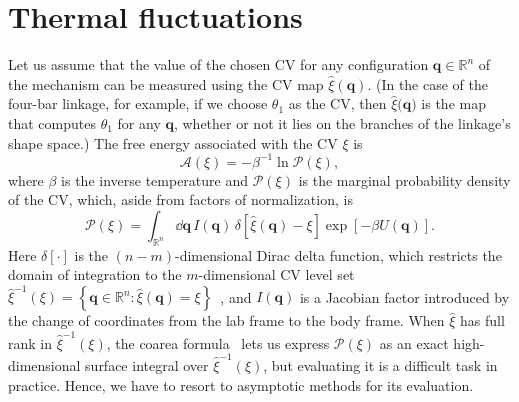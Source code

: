 \section{Thermal fluctuations}

Let us assume that the value of the chosen CV for any configuration $\bm{q} \in \mathbb{R}^{n}$ of the mechanism can be measured using the CV map $\hat{\xi}(\bm{q})$.
(In the case of the four-bar linkage, for example, if we choose $\theta_{1}$ as the CV, then $\hat{\xi}(\bm{q)}$ is the map that computes $\theta_{1}$ for any $\bm{q}$, whether or not it lies on the branches of the linkage's shape space.)
The free energy associated with the CV $\xi$ is~\cite{lelievre2010}
%
\begin{equation}
  \mathscr{A}(\xi) = -\beta^{-1}\ln{\mathscr{P}(\xi)},
  \label{eq:free_energy}
\end{equation}
%
where $\beta$ is the inverse temperature and $\mathscr{P}(\xi)$ is the marginal probability density of the CV, which, aside from factors of normalization, is
%
\begin{equation}
  \mathscr{P}(\xi) = \int_{\mathbb{R}^{n}} \dd\bm{q}\, I(\bm{q})\, \delta\left[\hat{\xi}(\bm{q}) - \xi\right] \exp\left[-\beta U(\bm{q})\right].
  \label{eq:mpd}
\end{equation}
%
Here $\delta[\cdot]$ is the $(n-m)$-dimensional Dirac delta function, which restricts the domain of integration to the $m$-dimensional CV level set $\hat{\xi}^{-1}(\xi) = \left\{\bm{q} \in \mathbb{R}^{n}: \hat{\xi}(\bm{q}) = \xi\right\}$~\cite{hartmann2011}, and $I(\bm{q})$ is a Jacobian factor introduced by the change of coordinates from the lab frame to the body frame.
When $\hat{\xi}$ has full rank in $\hat{\xi}^{-1}(\xi)$, the coarea formula~\cite{lelievre2010} lets us express $\mathscr{P}(\xi)$ as an exact high-dimensional surface integral over $\hat{\xi}^{-1}(\xi)$, but evaluating it is a difficult task in practice.
Hence, we have to resort to asymptotic methods for its evaluation.

